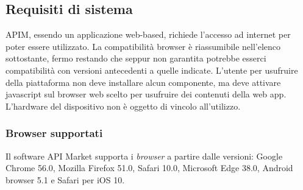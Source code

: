 \subsection{Requisiti di sistema}
APIM, essendo un applicazione web-based, richiede l'accesso ad internet per poter essere utilizzato. La compatibilità browser è riassumibile nell'elenco sottostante, fermo restando che seppur non garantita potrebbe esserci compatibilità con versioni antecedenti a quelle indicate. L'utente per usufruire della piattaforma non deve installare alcun componente, ma deve attivare javascript sul browser web scelto per usufruire dei contenuti della web app.
L'hardware del dispositivo non è oggetto di vincolo all'utilizzo.

\subsubsection{Browser supportati}
Il software API Market supporta i \textit{browser} a partire dalle versioni: Google Chrome 56.0, Mozilla Firefox 51.0, Safari 10.0, Microsoft Edge 38.0, Android browser 5.1 e Safari per iOS 10.




